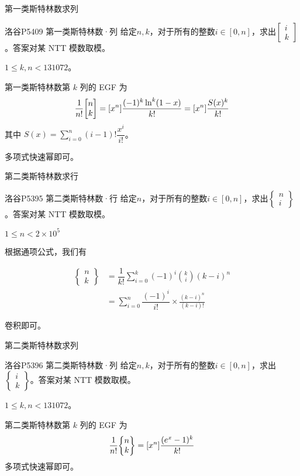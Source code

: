 \documentclass[UTF8]{beamer}
\begin{document}
    \begin{frame}{第一类斯特林数求列}
        \begin{block}{洛谷P5409 第一类斯特林数·列}
        给定$n,k$，对于所有的整数$i\in[0,n]$，求出$\begin{bmatrix}i\\ k\end{bmatrix}$。答案对某 NTT 模数取模。

        $1\leqslant k,n< 131072$。
        \end{block}
        \pause
        第一类斯特林数第 $k$ 列的 EGF 为
        $$
        \frac{1}{n!}\st nk = [x^n]\frac{(-1)^k\ln^k(1-x)}{k!}=[x^n]\dfrac{S(x)^k}{k!}
        $$
        其中 $S(x)=\sum\limits_{i=0}^n(i-1)!\dfrac{x^i}{i!}$。
        
        多项式快速幂即可。
    \end{frame}
    \begin{frame}{第二类斯特林数求行}
        \begin{block}{洛谷P5395 第二类斯特林数·行}
            给定$n$，对于所有的整数$i\in[0,n]$，求出$\begin{Bmatrix}n\\ i\end{Bmatrix}$。答案对某 NTT 模数取模。

    $1\le n< 2\times 10^5$
        \end{block}
        \pause

        根据通项公式，我们有

        $$
        \begin{aligned}
        \begin{Bmatrix}n\\k\end{Bmatrix}&=\dfrac{1}{k!}\sum\limits_{i=0}^k(-1)^i\binom{k}{i}(k-i)^n\\
        &=\sum\limits_{i=0}^n\dfrac{(-1)^i}{i!}\times \frac{(k-i)^n}{(k-i)!}
        \end{aligned}
        $$

        卷积即可。
    \end{frame}
    \begin{frame}{第二类斯特林数求列}
        \begin{block}{洛谷P5396 第二类斯特林数·列}
            给定$n,k$，对于所有的整数$i\in[0,n]$，求出$\begin{Bmatrix}i\\ k\end{Bmatrix}$。答案对某 NTT 模数取模。
    
            $1\leqslant k,n< 131072$。
        \end{block}
        \pause

        第二类斯特林数第 $k$ 列的 EGF 为
        $$
        \frac{1}{n!}\St nk = [x^n]\frac{(e^x-1)^k}{k!}
        $$
        多项式快速幂即可。
    \end{frame}
    
\end{document}
